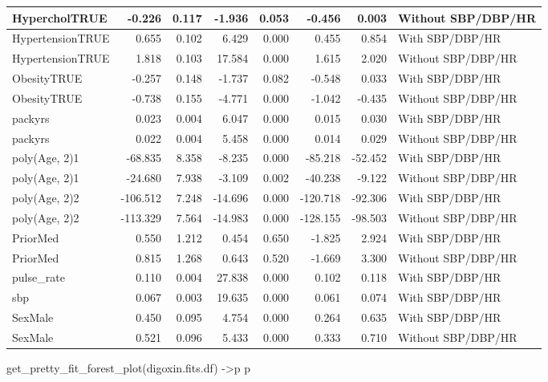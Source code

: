\documentclass[
]{article}
\newenvironment{Shaded}{\begin{snugshade}}{\end{snugshade}}
\newcommand{\FunctionTok}[1]{\textcolor[rgb]{0.00,0.00,0.00}{#1}}
\newcommand{\NormalTok}[1]{#1}
\newcommand{\OtherTok}[1]{\textcolor[rgb]{0.56,0.35,0.01}{#1}}
\begin{document}
\begin{table}
\begin{tabular}[t]{l|r|r|r|r|r|r|l}
\hline
HypercholTRUE & -0.226 & 0.117 & -1.936 & 0.053 & -0.456 & 0.003 & Without SBP/DBP/HR\\
\hline
HypertensionTRUE & 0.655 & 0.102 & 6.429 & 0.000 & 0.455 & 0.854 & With SBP/DBP/HR\\
\hline
HypertensionTRUE & 1.818 & 0.103 & 17.584 & 0.000 & 1.615 & 2.020 & Without SBP/DBP/HR\\
\hline
ObesityTRUE & -0.257 & 0.148 & -1.737 & 0.082 & -0.548 & 0.033 & With SBP/DBP/HR\\
\hline
ObesityTRUE & -0.738 & 0.155 & -4.771 & 0.000 & -1.042 & -0.435 & Without SBP/DBP/HR\\
\hline
packyrs & 0.023 & 0.004 & 6.047 & 0.000 & 0.015 & 0.030 & With SBP/DBP/HR\\
\hline
packyrs & 0.022 & 0.004 & 5.458 & 0.000 & 0.014 & 0.029 & Without SBP/DBP/HR\\
\hline
poly(Age, 2)1 & -68.835 & 8.358 & -8.235 & 0.000 & -85.218 & -52.452 & With SBP/DBP/HR\\
\hline
poly(Age, 2)1 & -24.680 & 7.938 & -3.109 & 0.002 & -40.238 & -9.122 & Without SBP/DBP/HR\\
\hline
poly(Age, 2)2 & -106.512 & 7.248 & -14.696 & 0.000 & -120.718 & -92.306 & With SBP/DBP/HR\\
\hline
poly(Age, 2)2 & -113.329 & 7.564 & -14.983 & 0.000 & -128.155 & -98.503 & Without SBP/DBP/HR\\
\hline
PriorMed & 0.550 & 1.212 & 0.454 & 0.650 & -1.825 & 2.924 & With SBP/DBP/HR\\
\hline
PriorMed & 0.815 & 1.268 & 0.643 & 0.520 & -1.669 & 3.300 & Without SBP/DBP/HR\\
\hline
pulse\_rate & 0.110 & 0.004 & 27.838 & 0.000 & 0.102 & 0.118 & With SBP/DBP/HR\\
\hline
sbp & 0.067 & 0.003 & 19.635 & 0.000 & 0.061 & 0.074 & With SBP/DBP/HR\\
\hline
SexMale & 0.450 & 0.095 & 4.754 & 0.000 & 0.264 & 0.635 & With SBP/DBP/HR\\
\hline
SexMale & 0.521 & 0.096 & 5.433 & 0.000 & 0.333 & 0.710 & Without SBP/DBP/HR\\
\hline
\end{tabular}
\end{table}

\begin{Shaded}
\begin{Highlighting}[]
\FunctionTok{get\_pretty\_fit\_forest\_plot}\NormalTok{(digoxin.fits.df) }\OtherTok{{-}\textgreater{}}\NormalTok{p}
\NormalTok{p}
\end{Highlighting}
\end{Shaded}
\end{document}
